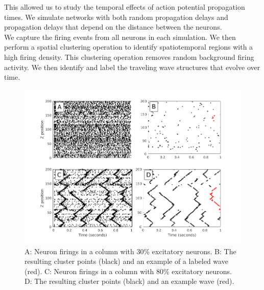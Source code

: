 \documentclass[a4paper,11pt]{article}
\begin{document}
This allowed us to study the temporal effects of action potential propagation times.
We simulate networks with both random propagation delays and propagation delays that depend on the distance between the neurons.
\\
We capture the firing events from all neurons in each simulation.
We then perform a spatial clustering operation to identify spatiotemporal regions with a high firing density.
This clustering operation removes random background firing activity.
We then identify and label the traveling wave structures that evolve over time.
\begin{figure}[ht]
 \caption{A: Neuron firings in a column with 30\% excitatory neurons. B: The resulting cluster points (black) and an example of a labeled wave (red).
          C: Neuron firings in a column with 80\% excitatory neurons. D: The resulting cluster points (black) and an example wave (red).}
 \label{fig:wave_analysis}
 \centering
   \includegraphics[width=\textwidth]{fig/WaveAnalysisExample}
\end{figure}
\end{document}
